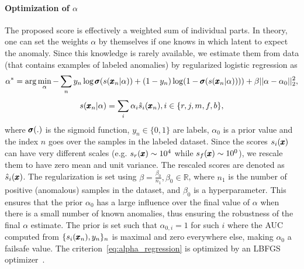 \paragraph{Optimization of $\alpha$ } The proposed score is effectively a weighted sum of individual parts. In theory, one can set the weights $\alpha$ by themselves if one knows in which latent to expect the anomaly. Since this knowledge is rarely available, we estimate them from data (that contains examples of labeled anomalies) by regularized logistic regression as
\begin{equation} \label{eq:alpha_regression}
    \alpha^* = \arg \min_{\alpha} - \sum_n y_n \log \pmb{{\sigma}} (s(\pmb{{x}}_n\vert\alpha)) + (1-y_n) \log(1-\pmb{{\sigma}} (s(\pmb{{x}}_n\vert\alpha)))) + \beta \vert \vert \alpha - \alpha_0 \vert \vert^2_2 ,
\end{equation}
\begin{equation}
    s(\pmb{{x}}_n\vert\alpha) = \sum_i \alpha_i \hat{s}_i(\pmb{{x}}_n), i \in \lbrace r, j, m, f, b \rbrace,
\end{equation}
where $\pmb{{\sigma}}(.)$ is the sigmoid function, $y_n \in \lbrace 0,1 \rbrace$ are labels, $\alpha_0$ is a prior value and the index $n$ goes over the samples in the labeled dataset. Since the scores $s_i(\pmb{{x}})$ can have very different scales (e.g. $s_r(\pmb{{x}}) \sim 10^4$ while $s_f(\pmb{{x}}) \sim 10^0$), we rescale them to have zero mean and unit variance. The rescaled scores are denoted as $\hat{s}_i(\pmb{{x}})$. The regularization is set using $\beta = \frac{\beta_0}{n_1}, \beta_0 \in \mathbb{R}$, where $n_1$ is the number of positive (anomalous) samples in the dataset, and $\beta_0$ is a hyperparameter. This ensures that the prior $\alpha_0$ has a large influence over the final value of $\alpha$ when there is a small number of known anomalies, thus ensuring the robustness of the final $\alpha$ estimate. The prior is set such that $\alpha_{0,i}=1$ for such $i$ where the AUC computed from $\lbrace s_{i}(\pmb{{x}}_n), y_n \rbrace_n$ is maximal and zero everywhere else, making $\alpha_0$ a failsafe value. The criterion~\eqref{eq:alpha_regression} is optimized by an LBFGS optimizer~\cite{liu1989limited}.

